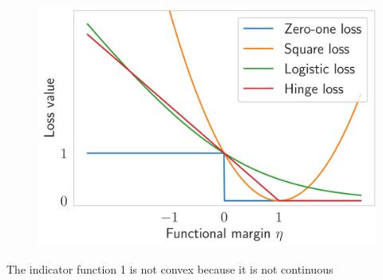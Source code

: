 \begin{figure} 
    \includegraphics*[width=0.5\columnwidth]{figures/classification_losses2.jpg}
\end{figure}

The indicator function 1 is not convex because it is not continuous













